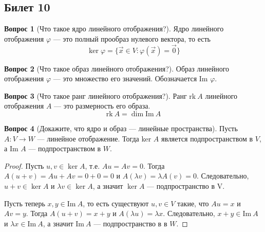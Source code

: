 \documentclass[a4paper,11pt]{article}
\theoremstyle{remark}
\theoremstyle{definition}
\newtheorem{question}{Вопрос}
\numberwithin{question}{subsection}
\begin{document}
\subsection{Билет 10}
\begin{question}[Что такое ядро линейного отображения?]
Ядро линейного отображения \(\varphi\) --- это полный прообраз нулевого вектора, то есть 
\begin{equation*}
	\ker \varphi = \{\vec{x} \in V\!: \varphi(\vec{x}) = \vec{0}\}
\end{equation*}
\end{question}


\begin{question}[Что такое образ линейного отображения?]
Образ линейного отображения \(\varphi\) --- это множество его значений. Обозначается Im \(\varphi\).
\end{question}


\begin{question}[Что такое ранг линейного отображения?]
Ранг \(\mathrm{rk}\:A\) линейного отображения \(A\) --- это размерность его образа.
\begin{equation*}
	\mathrm{rk}\:A = \dim \mathrm{Im}\:A
\end{equation*}
\end{question}


\begin{question}[Докажите, что ядро и образ --- линейные пространства]
Пусть \(A: V \rightarrow W\) --- линейное отображение. Тогда ker \(A\) является подпространством в \(V\), а Im \(A\) --- подпространством в \(W\).
\begin{proof}
Пусть \(u, v \in \ker A\), т.е. \(Au = Av = 0\). Тогда \(A(u + v) = Au + Av = 0 + 0 = 0\) и \(A(\lambda{}v) = \lambda{}A(v) = 0\). Следовательно, \(u + v \in \ker A\) и \(\lambda{}v \in \ker A\), а значит \(\ker A\) --- подпространство в V.

Пусть теперь \(x, y \in \mathrm{Im}\:A\), то есть существуют \(u, v \in V\) такие, что \(Au = x\) и \(Av = y\). Тогда \(A(u + v) = x + y\) и \(A(\lambda{}u) = \lambda{}x\). Следовательно, \(x + y \in \mathrm{Im}\:A\) и \(\lambda{}x \in \mathrm{Im}\:A\), а значит \(\mathrm{Im}\:A\) --- подпространство в в \(W\).
\end{proof}
\end{question}
\end{document}
